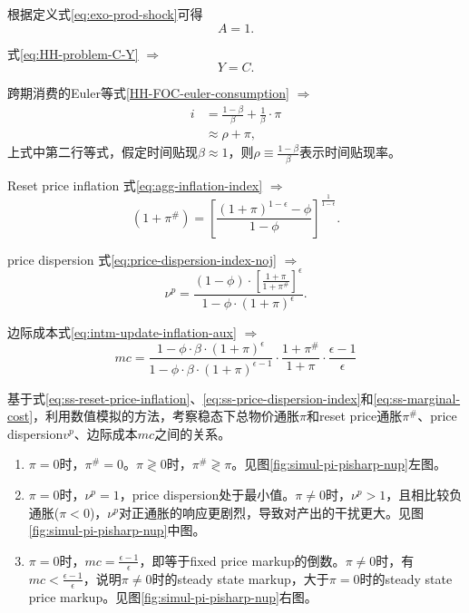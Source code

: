根据定义式\eqref{eq:exo-prod-shock}可得
\begin{equation}
  \label{eq:ss-A}
  A=1.
\end{equation}

式\eqref{eq:HH-problem-C-Y} $\Rightarrow$
\begin{equation}
  \label{eq:ss-C-Y}
  Y=C.
\end{equation}

跨期消费的Euler等式\eqref{HH-FOC-euler-consumption} $\Rightarrow$
  \begin{align}
  \label{eq:ss-interest-rate}
      i &= \frac{1-\beta}{\beta} + \frac{1}{\beta} \cdot \pi \nonumber \\
        &\approx \rho + \pi,
  \end{align}
上式中第二行等式，假定时间贴现$\beta \approx 1$，则$ \rho \equiv \frac{1-\beta}{\beta}$表示时间贴现率。

Reset price inflation 式\eqref{eq:agg-inflation-index} $\Rightarrow$
\begin{equation}
  \label{eq:ss-reset-price-inflation}
  (1+\pi^{\#}) = \left[
    \frac{(1+\pi)^{1-\epsilon} - \phi}{1-\phi}
  \right]^{\frac{1}{1-\epsilon}}.
\end{equation}

price dispersion 式\eqref{eq:price-dispersion-index-noj} $\Rightarrow$
\begin{equation}
  \label{eq:ss-price-dispersion-index}
  \nu^p = \frac{(1-\phi) \cdot \left[\frac{1+\pi}{1+\pi^{\#}} \right]^{\epsilon}}{1-\phi \cdot (1+\pi)^{\epsilon}}.
\end{equation}

边际成本式\eqref{eq:intm-update-inflation-aux} $\Rightarrow$
\begin{equation}
  \label{eq:ss-marginal-cost}
  mc = \frac{1-\phi \cdot \beta \cdot (1+\pi)^{\epsilon}}{1-\phi \cdot \beta \cdot (1+\pi)^{\epsilon-1}} \cdot \frac{1+\pi^{\#}}{1+\pi} \cdot \frac{\epsilon -1}{\epsilon}
\end{equation}

基于式\eqref{eq:ss-reset-price-inflation}、\eqref{eq:ss-price-dispersion-index}和\eqref{eq:ss-marginal-cost}，利用数值模拟的方法，考察稳态下总物价通胀$\pi$和reset price通胀$\pi^{\#}$、price dispersion$v^p$、边际成本$mc$之间的关系。

\begin{enumerate}
\item $\pi=0$时，$\pi^{\#}=0$。$\pi \gtrless 0$时，$\pi^{\#} \gtrless \pi$。见图\ref{fig:simul-pi-pisharp-nup}左图。
\item $\pi=0$时，$\nu^p=1$，price dispersion处于最小值。$\pi \neq 0$时，$\nu^{p} > 1$，且相比较负通胀($\pi <0$)，$\nu^p$对正通胀的响应更剧烈，导致对产出的干扰更大。见图\ref{fig:simul-pi-pisharp-nup}中图。
\item $\pi = 0$时，$mc=\frac{\epsilon-1}{\epsilon}$，即等于fixed price markup的倒数。$\pi \neq 0$时，有$mc < \frac{\epsilon -1}{\epsilon}$，说明$\pi \neq 0$时的steady state markup，大于$\pi = 0$时的steady state price markup。见图\ref{fig:simul-pi-pisharp-nup}右图。
\end{enumerate}


